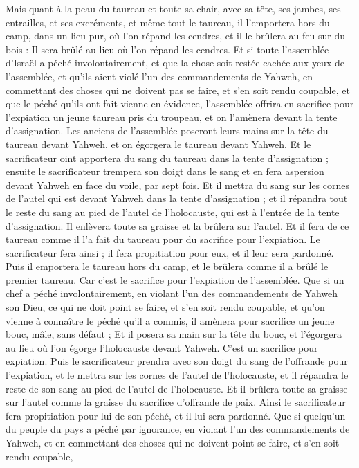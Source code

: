 \begin{multicols}{2}
Mais quant à la peau du taureau et toute sa chair, avec sa tête, ses jambes, ses entrailles, et ses excréments,
et même tout le taureau, il l'emportera hors du camp, dans un lieu pur, où l'on répand les cendres, et il le brûlera au feu sur du bois : Il sera brûlé au lieu où l'on répand les cendres.
Et si toute l'assemblée d'Israël a péché involontairement, et que la chose soit restée cachée aux yeux de l'assemblée, et qu'ils aient violé l'un des commandements de Yahweh, en commettant des choses qui ne doivent pas se faire, et s'en soit rendu coupable,
et que le péché qu'ils ont fait vienne en évidence, l'assemblée offrira en sacrifice pour l'expiation un jeune taureau pris du troupeau, et on l'amènera devant la tente d'assignation.
Les anciens de l'assemblée poseront leurs mains sur la tête du taureau devant Yahweh, et on égorgera le taureau devant Yahweh.
Et le sacrificateur oint apportera du sang du taureau dans la tente d'assignation ;
ensuite le sacrificateur trempera son doigt dans le sang et en fera aspersion devant Yahweh en face du voile, par sept fois.
Et il mettra du sang sur les cornes de l'autel qui est devant Yahweh dans la tente d'assignation ; et il répandra tout le reste du sang au pied de l'autel de l'holocauste, qui est à l'entrée de la tente d'assignation.
Il enlèvera toute sa graisse et la brûlera sur l'autel.
Et il fera de ce taureau comme il l'a fait du taureau pour du sacrifice pour l'expiation. Le sacrificateur fera ainsi ; il fera propitiation pour eux, et il leur sera pardonné.
Puis il emportera le taureau hors du camp, et le brûlera comme il a brûlé le premier taureau. Car c'est le sacrifice pour l'expiation de l'assemblée.
Que si un chef a péché involontairement, en violant l'un des commandements de Yahweh son Dieu, ce qui ne doit point se faire, et s'en soit rendu coupable,
et qu'on vienne à connaître le péché qu'il a commis, il amènera pour sacrifice un jeune bouc, mâle, sans défaut ;
Et il posera sa main sur la tête du bouc, et l'égorgera au lieu où l'on égorge l'holocauste devant Yahweh. C'est un sacrifice pour expiation.
Puis le sacrificateur prendra avec son doigt du sang de l'offrande pour l'expiation, et le mettra sur les cornes de l'autel de l'holocauste, et il répandra le reste de son sang au pied de l'autel de l'holocauste.
Et il brûlera toute sa graisse sur l'autel comme la graisse du sacrifice d'offrande de paix. Ainsi le sacrificateur fera propitiation pour lui de son péché, et il lui sera pardonné.
Que si quelqu'un du peuple du pays a péché par ignorance, en violant l'un des commandements de Yahweh, et en commettant des choses qui ne doivent point se faire, et s'en soit rendu coupable,

\end{multicols}
